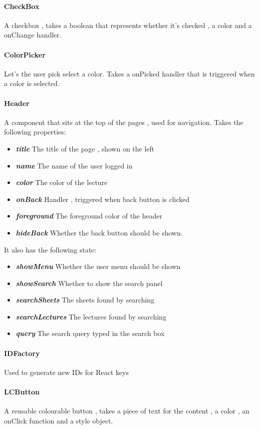 \paragraph{CheckBox} A checkbox , takes a boolean that represents whether it's checked , a color and a onChange handler.
\paragraph{ColorPicker} Let's the user pick select a color. Takes a onPicked handler that is triggered when a color is selected.
\paragraph{Header} A component that sits at the top of the pages , used for navigation. Takes the following properties:
\begin{itemize}
	\item \textit{\textbf{title}} The title of the page , shown on the left
	\item \textit{\textbf{name}} The name of the user logged in
	\item \textit{\textbf{color}} The color of the lecture
	\item \textit{\textbf{onBack}} Handler , triggered when back button is clicked
	\item \textit{\textbf{foreground}} The foreground color of the header
	\item \textit{\textbf{hideBack}} Whether the back button should be shown.
\end{itemize}
It also has the following state:
\begin{itemize}
	\item \textit{\textbf{showMenu}} Whether the user menu should be shown
	\item \textit{\textbf{showSearch}} Whether to show the search panel
	\item \textit{\textbf{searchSheets}} The sheets found by searching
	\item \textit{\textbf{searchLectures}} The lectures found by searching
	\item \textit{\textbf{query}} The search query typed in the search box
\end{itemize}
\paragraph{IDFactory} Used to generate new IDs for React keys
\paragraph{LCButton} A reusable colourable button , takes a piece of text for the content , a color , an onClick function and a style object.
